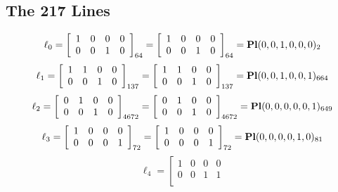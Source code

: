 \documentclass{article}
\begin{document}
{\subsection*{The 217 Lines}
$$
\ell_{0} = 
\left[
\begin{array}{*{4}{r}}
1 & 0 & 0 & 0\\
0 & 0 & 1 & 0\\
\end{array}
\right]
_{64}
=
\left[
\begin{array}{*{4}c}
1  & 0  & 0  & 0\\
0  & 0  & 1  & 0\\
\end{array}
\right]_{64}
={\rm\bf Pl}(0,0,1,0,0,0 )_{2}$$
$$
\ell_{1} = 
\left[
\begin{array}{*{4}{r}}
1 & 1 & 0 & 0\\
0 & 0 & 1 & 0\\
\end{array}
\right]
_{137}
=
\left[
\begin{array}{*{4}c}
1  & 1  & 0  & 0\\
0  & 0  & 1  & 0\\
\end{array}
\right]_{137}
={\rm\bf Pl}(0,0,1,0,0,1 )_{664}$$
$$
\ell_{2} = 
\left[
\begin{array}{*{4}{r}}
0 & 1 & 0 & 0\\
0 & 0 & 1 & 0\\
\end{array}
\right]
_{4672}
=
\left[
\begin{array}{*{4}c}
0  & 1  & 0  & 0\\
0  & 0  & 1  & 0\\
\end{array}
\right]_{4672}
={\rm\bf Pl}(0,0,0,0,0,1 )_{649}$$
$$
\ell_{3} = 
\left[
\begin{array}{*{4}{r}}
1 & 0 & 0 & 0\\
0 & 0 & 0 & 1\\
\end{array}
\right]
_{72}
=
\left[
\begin{array}{*{4}c}
1  & 0  & 0  & 0\\
0  & 0  & 0  & 1\\
\end{array}
\right]_{72}
={\rm\bf Pl}(0,0,0,0,1,0 )_{81}$$
$$
\ell_{4} = 
\left[
\begin{array}{*{4}{r}}
1 & 0 & 0 & 0\\
0 & 0 & 1 & 1\\
\end{array}
$$}
\end{document}
